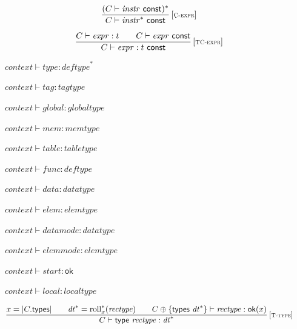 \vspace{1ex}

$$
\begin{array}{@{}c@{}}\displaystyle
\frac{
(C \vdash {\mathit{instr}}~\mathsf{const})^\ast
}{
C \vdash {{\mathit{instr}}^\ast}~\mathsf{const}
} \, {[\textsc{\scriptsize C{-}expr}]}
\qquad
\end{array}
$$

\vspace{1ex}

$$
\begin{array}{@{}c@{}}\displaystyle
\frac{
C \vdash {\mathit{expr}} : t
 \qquad
C \vdash {\mathit{expr}}~\mathsf{const}
}{
C \vdash {\mathit{expr}} : t~\mathsf{const}
} \, {[\textsc{\scriptsize TC{-}expr}]}
\qquad
\end{array}
$$

\vspace{1ex}

$\boxed{{\mathit{context}} \vdash {\mathit{type}} : {{\mathit{deftype}}^\ast}}$

$\boxed{{\mathit{context}} \vdash {\mathit{tag}} : {\mathit{tagtype}}}$

$\boxed{{\mathit{context}} \vdash {\mathit{global}} : {\mathit{globaltype}}}$

$\boxed{{\mathit{context}} \vdash {\mathit{mem}} : {\mathit{memtype}}}$

$\boxed{{\mathit{context}} \vdash {\mathit{table}} : {\mathit{tabletype}}}$

$\boxed{{\mathit{context}} \vdash {\mathit{func}} : {\mathit{deftype}}}$

$\boxed{{\mathit{context}} \vdash {\mathit{data}} : {\mathit{datatype}}}$

$\boxed{{\mathit{context}} \vdash {\mathit{elem}} : {\mathit{elemtype}}}$

$\boxed{{\mathit{context}} \vdash {\mathit{datamode}} : {\mathit{datatype}}}$

$\boxed{{\mathit{context}} \vdash {\mathit{elemmode}} : {\mathit{elemtype}}}$

$\boxed{{\mathit{context}} \vdash {\mathit{start}} : \mathsf{ok}}$

$\boxed{{\mathit{context}} \vdash {\mathit{local}} : {\mathit{localtype}}}$

$$
\begin{array}{@{}c@{}}\displaystyle
\frac{
x = {|C{.}\mathsf{types}|}
 \qquad
{{\mathit{dt}}^\ast} = {{{{\mathrm{roll}}}_{x}^\ast}}{({\mathit{rectype}})}
 \qquad
C \oplus \{ \mathsf{types}~{{\mathit{dt}}^\ast} \} \vdash {\mathit{rectype}} : {\mathsf{ok}}{(x)}
}{
C \vdash \mathsf{type}~{\mathit{rectype}} : {{\mathit{dt}}^\ast}
} \, {[\textsc{\scriptsize T{-}type}]}
\qquad
\end{array}
$$

